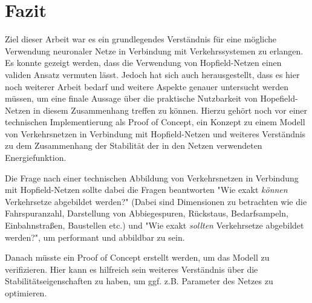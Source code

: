 \section{Fazit}

Ziel dieser Arbeit war es ein grundlegendes Verständnis für eine mögliche Verwendung neuronaler Netze in Verbindung mit Verkehrssystemen zu erlangen. Es konnte gezeigt werden, dass die Verwendung von Hopfield-Netzen einen validen Ansatz vermuten lässt. Jedoch hat sich auch herausgestellt, dass es hier noch weiterer Arbeit bedarf und weitere Aspekte genauer untersucht werden müssen, um eine finale Aussage über die praktische Nutzbarkeit von Hopefield-Netzen in diesem Zusammenhang treffen zu können. Hierzu gehört noch vor einer technischen Implementierung als Proof of Concept, ein Konzept zu einem Modell von Verkehrsnetzen in Verbindung mit Hopfield-Netzen und weiteres Verständnis zu dem Zusammenhang der Stabilität der in den Netzen verwendeten Energiefunktion.

Die Frage nach einer technischen Abbildung von Verkehrsnetzen in Verbindung mit Hopfield-Netzen sollte dabei die Fragen beantworten "Wie exakt \textit{können} Verkehrsetze abgebildet werden?" (Dabei sind Dimensionen zu betrachten wie die Fahrspuranzahl, Darstellung von Abbiegespuren, Rückstaus, Bedarfsampeln, Einbahnstraßen, Baustellen etc.) und "Wie exakt \textit{sollten} Verkehrsetze abgebildet werden?", um performant und abbildbar zu sein.

Danach müsste ein Proof of Concept erstellt werden, um das Modell zu verifizieren. Hier kann es hilfreich sein weiteres Verständnis über die Stabilitätseigenschaften zu haben, um ggf. z.B. Parameter des Netzes zu optimieren.
